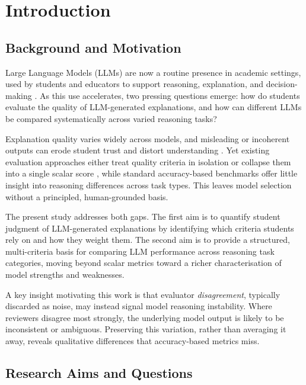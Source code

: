 \chapter{Introduction}
\label{ch:introduction}

\section{Background and Motivation}
\label{sec:intro-background}

Large Language Models (LLMs) are now a routine presence in academic settings, used
by students and educators to support reasoning, explanation, and decision-making
\citep{miliani2026explica, zhang2023llmeval, lin2024criticbench}. As this use
accelerates, two pressing questions emerge: how do students evaluate the quality of
LLM-generated explanations, and how can different LLMs be compared systematically
across varied reasoning tasks?

Explanation quality varies widely across models, and misleading or incoherent
outputs can erode student trust and distort understanding \citep{kiciman2024causal}.
Yet existing evaluation approaches either treat quality criteria in isolation or
collapse them into a single scalar score \citep{ehsan2020human}, while standard
accuracy-based benchmarks offer little insight into reasoning differences across
task types. This leaves model selection without a principled, human-grounded basis.

The present study addresses both gaps. The first aim is to quantify student judgment
of LLM-generated explanations by identifying which criteria students rely on and how
they weight them. The second aim is to provide a structured, multi-criteria basis for
comparing LLM performance across reasoning task categories, moving beyond scalar
metrics toward a richer characterisation of model strengths and weaknesses.

A key insight motivating this work is that evaluator \emph{disagreement}, typically
discarded as noise, may instead signal model reasoning instability. Where reviewers
disagree most strongly, the underlying model output is likely to be inconsistent or
ambiguous. Preserving this variation, rather than averaging it away, reveals
qualitative differences that accuracy-based metrics miss.

\section{Research Aims and Questions}
\label{sec:intro-aims}

